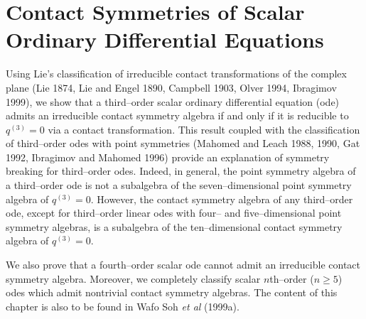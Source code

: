 \setlength{\parindent}{0mm}
\setlength{\parskip}{14pt}
\renewcommand{\baselinestretch}{1.5}
\setlength{\topmargin}{0pt}
\setlength{\headheight}{0pt}
\setlength{\headsep}{0pt}
\setlength{\footskip}{45pt}
\setlength{\footheight}{0pt}
\setlength{\textwidth}{465pt}
\setlength{\textheight}{660pt}
\setlength{\oddsidemargin}{5pt}
\newcommand{\RR}{\mathrm{I\!R\!}}
\newcommand{\FF}{\mathrm{I\!F\!}}
\newcommand{\LL}{{\cal L}}
\newcommand{\dt}{\displaystyle{\frac{\partial}{\partial t}}}
\newcommand{\dq}{\displaystyle{\frac{\partial}{\partial q }}}
\newcommand{\dr}{\displaystyle{\frac{\partial}{\partial p }}}
\newtheorem{defi}{Definition}[chapter]
\newtheorem{theo}{Theorem}[chapter]
\newtheorem{lem}{Lemma}[chapter]


\chapter{Contact Symmetries of Scalar Ordinary Differential Equations}
Using Lie's classification of irreducible contact transformations of the
complex plane (Lie 1874, Lie and Engel 1890, Campbell 1903, Olver 1994,
Ibragimov 1999),
we show that
a third--order scalar ordinary differential equation (ode)
admits an irreducible contact symmetry algebra if and only if it is reducible
to $q^{(3)}=0$ via a contact transformation. This result coupled with the
classification of third--order odes with point symmetries
(Mahomed and Leach 1988, 1990, Gat 1992, Ibragimov and Mahomed 1996)
provide an explanation of symmetry breaking for third--order odes. Indeed, in
general, the  point symmetry algebra of a third--order ode is not a
subalgebra of the seven--dimensional point symmetry algebra of $q^{(3)}=0$.
However, the contact symmetry algebra of any third--order ode, except for
third--order linear odes with four-- and five--dimensional point
symmetry algebras,  is a subalgebra of the ten--dimensional contact symmetry
algebra of $q^{(3)}=0$.

We also prove that a fourth--order
scalar ode cannot admit an irreducible contact symmetry algebra.
Moreover, we completely classify scalar $n$th--order ($n\ge 5$) odes
which admit nontrivial contact symmetry algebras.
The content of
this chapter is also to be found in Wafo Soh {\em et al} (1999a).


